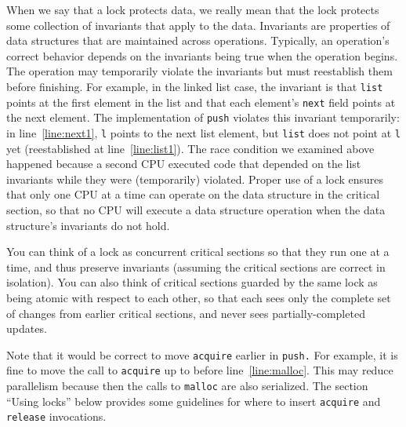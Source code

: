 When we say that a lock protects data, we really mean
that the lock protects some collection of invariants
that apply to the data.
Invariants are properties of data structures that
are maintained across operations.
Typically, an operation's correct behavior depends
on the invariants being true when the operation
begins.  The operation may temporarily violate
the invariants but must reestablish them before
finishing.
For example, in the linked list case, the invariant is that
\lstinline{list}
points at the first element in the list
and that each element's
\lstinline{next}
field points at the next element.
The implementation of
\lstinline{push}
violates this invariant temporarily: in line~\ref{line:next1},
\lstinline{l}
points
to the next list element, but
\lstinline{list}
does not point at
\lstinline{l}
yet (reestablished at line~\ref{line:list1}).
The race condition we examined above
happened because a second CPU executed
code that depended on the list invariants
while they were (temporarily) violated.
Proper use of a lock ensures that only one CPU at a time
can operate on the data structure in the critical section, so that
no CPU will execute a data structure operation when the 
data structure's invariants do not hold.

You can think of a lock as
concurrent critical sections so that they run one at a time,
and thus preserve invariants (assuming the critical sections
are correct in isolation).
You can also think of critical sections guarded by the same lock as being
atomic with respect to each other,
so that each sees only the complete set of
changes from earlier critical sections, and never sees
partially-completed updates.

Note that it would be correct to move
\lstinline{acquire}
earlier in
\lstinline{push.}
For example, it is fine to move the call to
\lstinline{acquire}
up to before line~\ref{line:malloc}.
This may reduce parallelism because then the calls
to
\lstinline{malloc}
are also serialized.
The section ``Using locks'' below provides some guidelines for where to insert
\lstinline{acquire}
and
\lstinline{release}
invocations.
